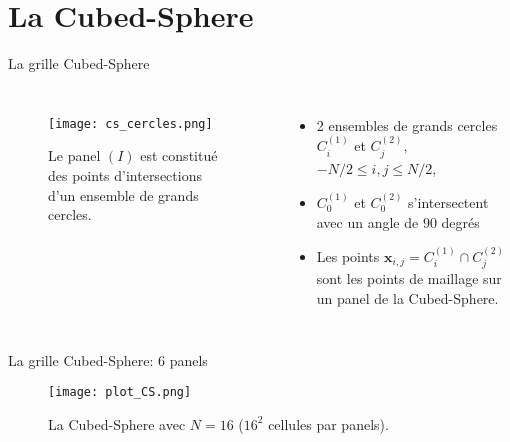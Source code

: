 \documentclass[11pt]{beamer}
\begin{document}
\section{La Cubed-Sphere}
\begin{frame}{La grille Cubed-Sphere}
\begin{columns}
\begin{figure}[htbp]
\begin{center}
\texttt{[image: cs\_cercles.png]}
\end{center}
\caption{Le panel $(I)$ est constitué des points d'intersections d'un ensemble de grands cercles.}
\label{fig: panel I}
\end{figure}  

\begin{itemize}
\item 2 ensembles de grands cercles $C_i^{(1)}$ et $C_j^{(2)}$, $-N/2 \leq i,j \leq N/2$,

\item $C_0^{(1)}$ et $C_0^{(2)}$ s'intersectent avec un angle de $90$ degrés

\item Les points $\mathbf{x}_{i,j}=C_i^{(1)} \cap C_j^{(2)}$ sont les points de maillage sur un panel de la Cubed-Sphere.
\end{itemize}
\end{columns}
\end{frame}













\begin{frame}{La grille Cubed-Sphere: 6 panels}
\begin{figure}
\begin{center}
\hspace{-1.cm}
\texttt{[image: plot\_CS.png]}
\caption{La Cubed-Sphere avec $N=16$ ($16^2$ cellules par panels).
}
\end{center}
\end{figure}
\end{frame}
\end{document}
